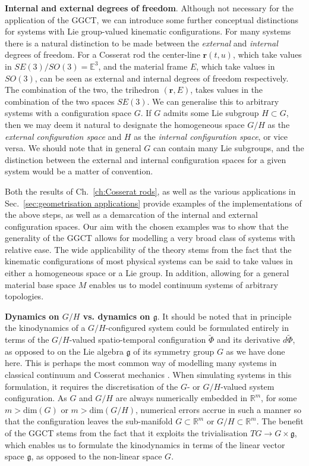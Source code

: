 \textbf{Internal and external degrees of freedom}. Although not necessary for the application of the GGCT, we can introduce some further conceptual distinctions for systems with Lie group-valued kinematic configurations. For many systems there is a natural distinction to be made between the \textit{external} and \textit{internal} degrees of freedom. For a Cosserat rod the center-line $\mathbf{r}(t,u)$, which take values in $SE(3) / SO(3) = \mathbb{E}^3$, and the material frame $E$, which take values in $SO(3)$, can be seen as external and internal degrees of freedom respectively. The combination of the two, the trihedron $(\mathbf{r}, E)$, takes values in the combination of the two spaces $SE(3)$. We can generalise this to arbitrary systems with a configuration space $G$. If $G$ admits some Lie subgroup $H \subset G$, then we may deem it natural to designate the homogeneous space $G/H$ as the \textit{external configuration space} and $H$ as the \textit{internal configuration space}, or vice versa. We should note that in general $G$ can contain many Lie subgroups, and the distinction between the external and internal configuration spaces for a given system would be a matter of convention.

Both the results of Ch.~\ref{ch:Cosserat rods}, as well as the various applications in Sec.~\ref{sec:geometrisation applications} provide examples of the implementations of the above steps, as well as a demarcation of the internal and external configuration spaces. Our aim with the chosen examples was to show that the generality of the GGCT allows for modelling a very broad class of systems with relative ease. The wide applicability of the theory stems from the fact that the kinematic configurations of most physical systems can be said to take values in either a homogeneous space or a Lie group. In addition, allowing for a general material base space $M$ enables us to model continuum systems of arbitrary topologies. 

\textbf{Dynamics on $G/H$ vs. dynamics on $\mathfrak{g}$}. It should be noted that in principle the kinodynamics of a $G/H$-configured system could be formulated entirely in terms of the $G/H$-valued spatio-temporal configuration $\tilde{\Phi}$ and its derivative $d \tilde{\Phi}$, as opposed to on the Lie algebra $\mathfrak{g}$ of its symmetry group $G$ as we have done here. This is perhaps the most common way of modelling many systems in classical continuum and Cosserat mechanics \citep{naughtonElasticaCompliantMechanics2021, powersDynamicsFilamentsMembranes2010, stefanouThreedimensionalCosseratHomogenization2008, caoNonlinearDynamicsElastic2008}. When simulating systems in this formulation, it requires the discretisation of the $G$- or $G/H$-valued system configuration. As $G$ and $G/H$ are always numerically embedded in $\mathbb{R}^m$, for some $m > \text{dim}(G)$ or $m > \text{dim}(G/H)$, numerical errors accrue in such a manner so that the configuration leaves the sub-manifold $G \subset \mathbb{R}^m$ or $G/H \subset \mathbb{R}^m$. The benefit of the GGCT stems from the fact that it exploits the trivialisation $TG \to G \times \mathfrak{g}$, which enables us to formulate the kinodynamics in terms of the linear vector space $\mathfrak{g}$, as opposed to the non-linear space $G$.

